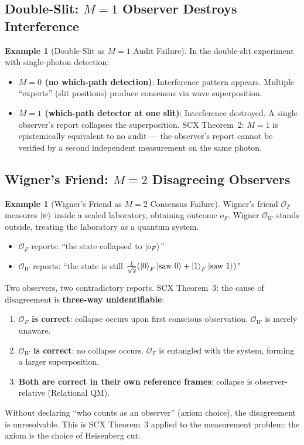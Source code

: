 \documentclass[11pt,a4paper]{article}
\theoremstyle{definition}
\newtheorem{example}[theorem]{Example}
\theoremstyle{remark}
\newcommand{\Obs}{\mathcal{O}}
\begin{document}
\subsection{Double-Slit: $M=1$ Observer Destroys Interference}

\begin{example}[Double-Slit as $M=1$ Audit Failure]
In the double-slit experiment with single-photon detection:
\begin{itemize}[nosep]
    \item \textbf{$M=0$ (no which-path detection)}: Interference pattern appears. Multiple ``experts'' (slit positions) produce consensus via wave superposition.
    \item \textbf{$M=1$ (which-path detector at one slit)}: Interference destroyed. A single observer's report collapses the superposition. SCX Theorem~2: $M=1$ is epistemically equivalent to no audit --- the observer's report cannot be verified by a second independent measurement on the same photon.
\end{itemize}
\end{example}

\subsection{Wigner's Friend: $M=2$ Disagreeing Observers}

\begin{example}[Wigner's Friend as $M=2$ Consensus Failure]
Wigner's friend $\Obs_F$ measures $\ket{\psi}$ inside a sealed laboratory, obtaining outcome $o_F$. Wigner $\Obs_W$ stands outside, treating the laboratory as a quantum system.

\begin{itemize}[nosep]
    \item $\Obs_F$ reports: ``the state collapsed to $\ket{o_F}$''
    \item $\Obs_W$ reports: ``the state is still $\frac{1}{\sqrt{2}}(\ket{0}_F\ket{\text{saw }0} + \ket{1}_F\ket{\text{saw }1})$''
\end{itemize}

Two observers, two contradictory reports. SCX Theorem~3: the cause of disagreement is \textbf{three-way unidentifiable}:
\begin{enumerate}[nosep]
    \item \textbf{$\Obs_F$ is correct}: collapse occurs upon first conscious observation. $\Obs_W$ is merely unaware.
    \item \textbf{$\Obs_W$ is correct}: no collapse occurs. $\Obs_F$ is entangled with the system, forming a larger superposition.
    \item \textbf{Both are correct in their own reference frames}: collapse is observer-relative (Relational QM).
\end{enumerate}
Without declaring ``who counts as an observer'' (axiom choice), the disagreement is unresolvable. This is SCX Theorem~3 applied to the measurement problem: the axiom is the choice of Heisenberg cut.
\end{example}
\end{document}
